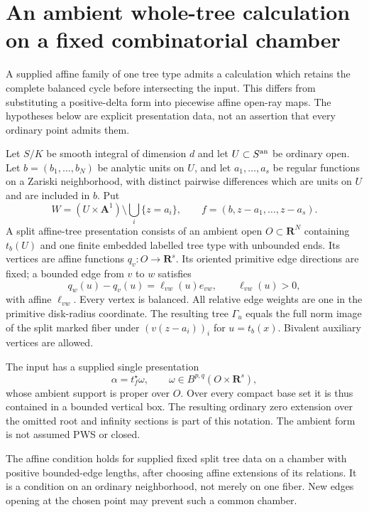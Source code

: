 \section{An ambient whole-tree calculation on a fixed combinatorial chamber}
\label{r15ft:section}

A supplied affine family of one tree type admits a calculation which
retains the complete balanced cycle before intersecting the input.
This differs from substituting a positive-delta form into piecewise
affine open-ray maps. The hypotheses below are explicit presentation
data, not an assertion that every ordinary point admits them.

\begin{definition}
\label{r15ft:data}
Let $S/K$ be smooth integral of dimension $d$ and let
$U\subset S^{\rm an}$ be ordinary open. Let $b=(b_1,\ldots,b_N)$
be analytic units on $U$, and let $a_1,\ldots,a_s$ be regular
functions on a Zariski neighborhood, with distinct pairwise
differences which are units on $U$ and are included in $b$.
Put
\[
 W=(U\times\mathbf A^1)\setminus\bigcup_i\{z=a_i\},
       \qquad f=(b,z-a_1,\ldots,z-a_s).
\tag{FT15.1}\label{r15ft:moments}
\]
A split affine-tree presentation consists of an ambient open
$O\subset\mathbf R^N$ containing $t_b(U)$ and one finite embedded
labelled tree type with unbounded ends. Its vertices are affine
functions $q_v:O\to\mathbf R^s$. Its oriented primitive edge
directions are fixed; a bounded edge from $v$ to $w$ satisfies
\[
 q_w(u)-q_v(u)=\ell_{vw}(u)e_{vw},\qquad\ell_{vw}(u)>0,
\tag{FT15.2}\label{r15ft:edges}
\]
with affine $\ell_{vw}$. Every vertex is balanced. All relative
edge weights are one in the primitive disk-radius coordinate.
The resulting tree $\Gamma_u$ equals the full norm image of the
split marked fiber under $(v(z-a_i))_i$ for $u=t_b(x)$.
Bivalent auxiliary vertices are allowed.

The input has a supplied single presentation
\[
       \alpha=t_f^\star\omega,
       \qquad\omega\in B^{p,q}(O\times\mathbf R^s),
\tag{FT15.3}\label{r15ft:input}
\]
whose ambient support is proper over $O$. Over every compact
base set it is thus contained in a bounded vertical box. The
resulting ordinary zero extension over the omitted root and
infinity sections is part of this notation. The ambient form
is not assumed PWS or closed.
\end{definition}

The affine condition holds for supplied fixed split tree data on
a chamber with positive bounded-edge lengths, after choosing
affine extensions of its relations. It is a condition on an
ordinary neighborhood, not merely on one fiber. New edges opening
at the chosen point may prevent such a common chamber.

